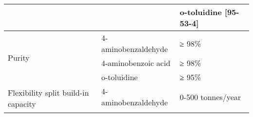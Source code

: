 \begin{landscape}
\begin{table}[]
\begin{tabular}{@{}|l|l|l|@{}}
\multicolumn{2}{|l|}{}                                                     & o-toluidine {[}95-53-4{]}                                                                                                                                                                                                                                                                                                                                                                                             \\ \midrule
\multirow{3}{*}{Purity}                              & 4-aminobenzaldehyde & ≥ 98\%                                                                                                                                                                                                                                                                                                                                                                                                                \\ \cmidrule(l){2-3} 
                                                     & 4-aminobenzoic acid & ≥ 98\%                                                                                                                                                                                                                                                                                                                                                                                                                \\ \cmidrule(l){2-3} 
                                                     & o-toluidine         & ≥ 95\%                                                                                                                                                                                                                                                                                                                                                                                                                \\ \midrule
\multirow{3}{*}{Flexibility split build-in capacity} & 4-aminobenzaldehyde & 0-500 tonnes/year                                                                                                                                                                                                                                                                                                                                                                                                     \\ \cmidrule(l){2-3} 

\end{tabular}
\end{table}
\end{landscape}
